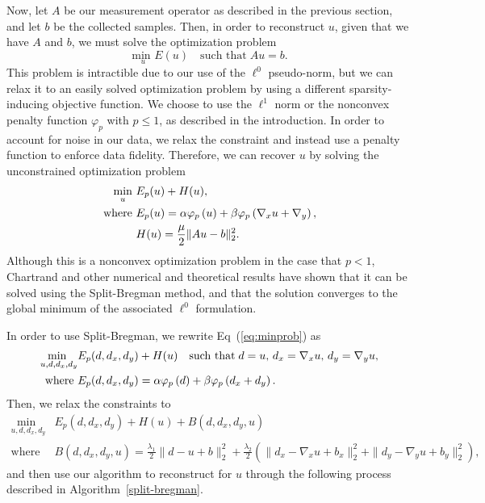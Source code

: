 \documentclass[english]{article}\usepackage[]{graphicx}\usepackage[]{color}
\begin{document}
Now, let $A$ be our measurement operator as described in the previous section, and let 
$b$ be the collected samples. Then, in order to reconstruct $u$, given that we have $A$ and $b$, we must solve the optimization problem
\[ \underset{u}{{\text{{min }}}} E(u)\quad\text{such that}\; Au=b.\]
This problem is intractible due to our use of the $\ell^0$ pseudo-norm, but we 
can relax it to an easily solved optimization problem by using a different sparsity-inducing 
objective function. We choose to use the $\ell^1$ norm or the nonconvex penalty function
$\varphi_p$ with $p \leq 1$, as described in the introduction. In order to account for noise 
in our data, we relax the constraint and instead use a penalty function to enforce data 
fidelity. Therefore, we can recover $u$ by solving the unconstrained optimization problem 
\begin{align}
\underset{u}{\text{min}}\text{\ }&E_{p}(u)+H(u),\label{eq:minprob}\\
\text{where }&E_{p}(u)=\alpha\varphi_p\left(u\right)+\beta\varphi_p\left(\nabla_x u + \nabla_y\right),\notag\\
&H(u)=\frac{\mu}{2}\|Au-b\|_2^2.\notag
\end{align}
Although this is a nonconvex optimization problem in the case that $p<1$,
Chartrand \cite{chartrand2009fast} and other numerical and theoretical results have shown that it can be solved using the Split-Bregman method, 
and that the solution converges to the global minimum of the 
associated $\ell^0$ formulation.

In order to use Split-Bregman, we rewrite Eq~(\ref{eq:minprob}) as
\begin{align}
\underset{u,d,d_{x},d_{y}}{{\text{{min }}}}&E_{p}(d,d_x,d_y)+H(u)\quad\text{such that}\; d=u,\, d_{x}=\nabla_{x}u,\, d_{y}=\nabla_{y}u,  \notag\\
\text{where }&E_p(d,d_x,d_y)=\alpha\varphi_p\left(d\right)+\beta\varphi_p\left(d_x +
 d_y\right).\notag
\end{align}
Then, we relax the constraints to
\begin{align*}
\underset{u,d,d_{x},d_{y}}{{\text{{min }}}}&E_{p}(d,d_x,d_y)+H(u)+B(d,d_x,d_y,u)\\
\text{where }&B(d,d_x,d_y,u)=\frac{\lambda_1}{2}\|d-u+b\|_{2}^{2}+\frac{\lambda_2}{2}\left(\|d_{x}-\nabla_{x}u+b_{x}\|_{2}^{2}+\|d_{y}-\nabla_{y}u+b_{y}\|_{2}^{2}\right),
\end{align*}
and then use our algorithm to reconstruct for $u$ through the following process described in Algorithm~\ref{split-bregman}.
\end{document}
